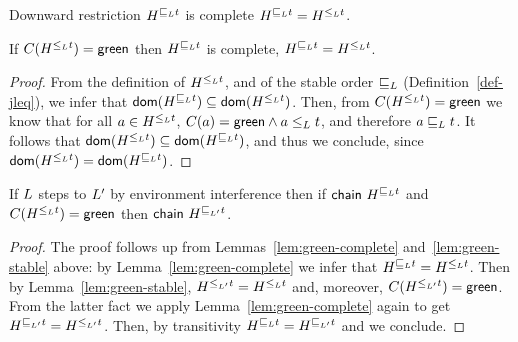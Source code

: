 
\begin{definition}[Complete]\label{def:complete}
Downward restriction $\chainjleq{t}{\ordlist}$ is {\sf complete} \Iff
$\chainjleq{t}{\ordlist} = \chaintleq{t}{\ordlist}$.
\end{definition}

\begin{lemma}\label{lem:green-complete}
  If $\C(\chaintleq{t}{\ordlist}) = {\sf green}$ then
  $\chainjleq{t}{\ordlist}$ is {\sf complete},
  \ie $\chainjleq{t}{\ordlist} = \chaintleq{t}{\ordlist}$.
\end{lemma}

\begin{proof}
From the definition of $\chaintleq{t}{\ordlist}$, and of the stable
order $\jleq$ (Definition~\ref{def-jleq}), we infer that
$\dom{\chainjleq{t}{\ordlist}} \subseteq
\dom{\chaintleq{t}{\ordlist}}$. Then, from
$\C(\chaintleq{t}{\ordlist}) = {\sf green}$ we know that for all $a
\in \chaintleq{t}{\ordlist}$, $\C(a) = {\sf green} \wedge a \tleq t$,
and therefore $ a \jleq t$. It follows that
$\dom{\chaintleq{t}{\ordlist}} \subseteq
\dom{\chainjleq{t}{\ordlist}}$, and thus we conclude, since
$\dom{\chaintleq{t}{\ordlist}} = \dom{\chainjleq{t}{\ordlist}}$.
\end{proof}


\begin{lemma}%
\label{lem:chain-stable}%
If $\ordlist$ steps to $\ordlist'$ by environment interference then
if $\mathsf{chain}\ \chainjleq{t}{\ordlist}$ and
$\C(\chaintleq{t}{\ordlist}) = {\sf green}$ then
$\mathsf{chain}\ \chainjleq{t}{\ordlist'}$.
\end{lemma}

\begin{proof}
The proof follows up from Lemmas~\ref{lem:green-complete}
and~\ref{lem:green-stable} above: by Lemma~\ref{lem:green-complete} we
infer that $\chainjleq{t}{\ordlist} = \chaintleq{t}{\ordlist}$. Then
by Lemma~\ref{lem:green-stable}, $\chaintleq{t}{\ordlist'} =
\chaintleq{t}{\ordlist}$ and, moreover, $\C(\chaintleq{t}{\ordlist'})
= {\sf green}$. From the latter fact we apply
Lemma~\ref{lem:green-complete} again to get $\chainjleq{t}{\ordlist'}
= \chaintleq{t}{\ordlist'}$. Then, by transitivity
$\chainjleq{t}{\ordlist} = \chainjleq{t}{\ordlist'}$ and we conclude.
\end{proof}

